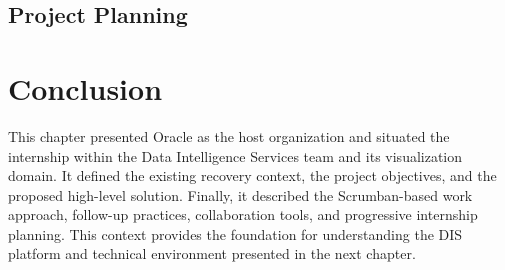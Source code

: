 
\subsection{Project Planning}


\section*{Conclusion}

This chapter presented Oracle as the host organization and situated the
internship within the Data Intelligence Services team and its visualization
domain. It defined the existing recovery context, the project objectives, and
the proposed high-level solution. Finally, it described the Scrumban-based work
approach, follow-up practices, collaboration tools, and progressive internship
planning. This context provides the foundation for understanding the DIS
platform and technical environment presented in the next chapter.
